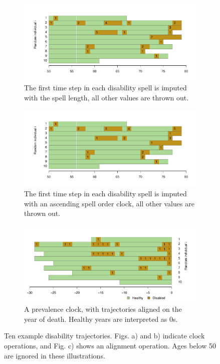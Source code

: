 \documentclass{article}
\begin{document}
\begin{figure}
    \centering
    \begin{subfigure}{\textwidth}
      \centering
    \includegraphics[scale=.5]{Spells/Figures/App1_grammar1.pdf}
    \caption{The first time step in each disability spell is imputed with the spell length, all other values are thrown out.}
    \label{fig:a1g1}
    \end{subfigure}
    
        \begin{subfigure}{\textwidth}
          \centering
    \includegraphics[scale=.5]{Spells/Figures/App1_grammar2.pdf}
    \caption{The first time step in each disability spell is imputed with an ascending spell order clock, all other values are thrown out.}
    \label{fig:a1g2}
    \end{subfigure}
    
        \begin{subfigure}{\textwidth}
          \centering
          \includegraphics[scale=.5]{Spells/Figures/App1_grammar3.pdf}
    \caption{A prevalence clock, with trajectories aligned on the year of death. Healthy years are interpreted as 0s.}
    \label{fig:a1g3}
    \end{subfigure}
    \caption{Ten example disability trajectories. Figs. a) and b) indicate clock operations, and Fig. c) shows an alignment operation. Ages below 50 are ignored in these illustrations.}
    \label{fig:a1traj}
\end{figure}
\end{document}
